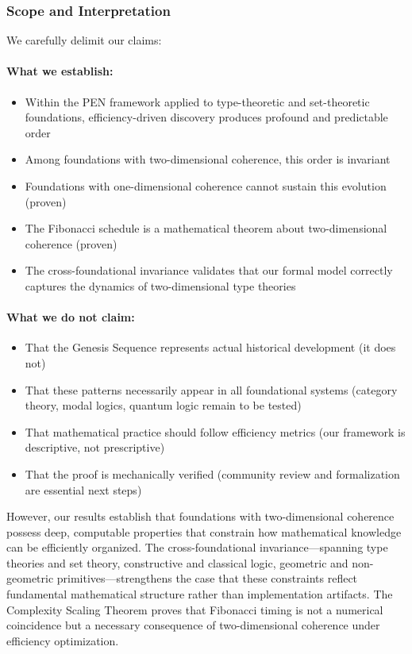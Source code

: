 \documentclass[11pt]{article}
\theoremstyle{definition}
\theoremstyle{remark}
\begin{document}
\subsubsection*{Scope and Interpretation}

We carefully delimit our claims:

\paragraph{What we establish:}
\begin{itemize}
\item Within the PEN framework applied to type-theoretic and set-theoretic foundations, efficiency-driven discovery produces profound and predictable order
\item Among foundations with two-dimensional coherence, this order is invariant
\item Foundations with one-dimensional coherence cannot sustain this evolution (proven)
\item The Fibonacci schedule is a mathematical theorem about two-dimensional coherence (proven)
\item The cross-foundational invariance validates that our formal model correctly captures the
dynamics of two-dimensional type theories
\end{itemize}

\paragraph{What we do not claim:}
\begin{itemize}
\item That the Genesis Sequence represents actual historical development (it does not)
\item That these patterns necessarily appear in all foundational systems (category theory, modal
logics, quantum logic remain to be tested)
\item That mathematical practice should follow efficiency metrics (our framework is descriptive, not
prescriptive)
\item That the proof is mechanically verified (community review and formalization are essential next
steps)
\end{itemize}

However, our results establish that foundations with two-dimensional coherence possess deep,
computable properties that constrain how mathematical knowledge can be efficiently organized.
The cross-foundational invariance---spanning type theories and set theory, constructive and classical
logic, geometric and non-geometric primitives---strengthens the case that these constraints reflect
fundamental mathematical structure rather than implementation artifacts. The Complexity Scaling
Theorem proves that Fibonacci timing is not a numerical coincidence but a necessary consequence
of two-dimensional coherence under efficiency optimization.
\end{document}
